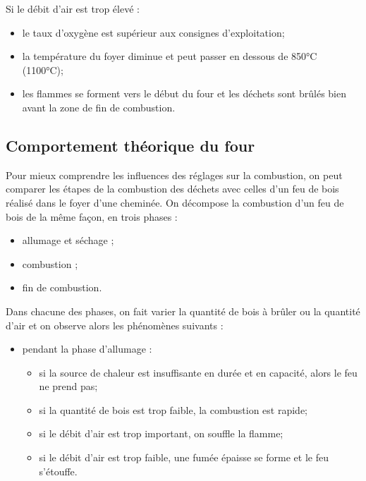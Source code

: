 Si le débit d'air est trop élevé : 
\begin{itemize}
\item  le taux d’oxygène est supérieur aux consignes d’exploitation;
\item  la température du foyer diminue et peut passer en dessous de 850°C (1100°C);
\item  les flammes se forment vers le début du four et les déchets sont brûlés bien avant la zone de fin de combustion.

\end{itemize}




\subsection{Comportement théorique du four}


Pour mieux comprendre les influences des réglages sur la combustion, on peut comparer les étapes de la combustion des déchets avec celles d’un feu de bois réalisé dans le foyer d’une cheminée. On décompose la combustion d’un feu de bois de la même façon, en trois phases :
\begin{itemize}
  \item allumage et séchage ;
  \item combustion ;
  \item fin de combustion.
\end{itemize}


Dans chacune des phases, on fait varier la quantité de bois à brûler ou la quantité d’air et on observe alors les phénomènes suivants :
\begin{itemize}
   \item pendant la phase d'allumage :
   \begin{itemize}
\item  si la source de chaleur est insuffisante en durée et en capacité, alors le feu ne prend pas;
\item  si la quantité de bois est trop faible, la combustion est rapide;
\item  si le débit d’air est trop important, on souffle la flamme;
\item  si le débit d’air est trop faible, une fumée épaisse se forme et le feu s’étouffe.


   \end{itemize}

 \end{itemize}
 
